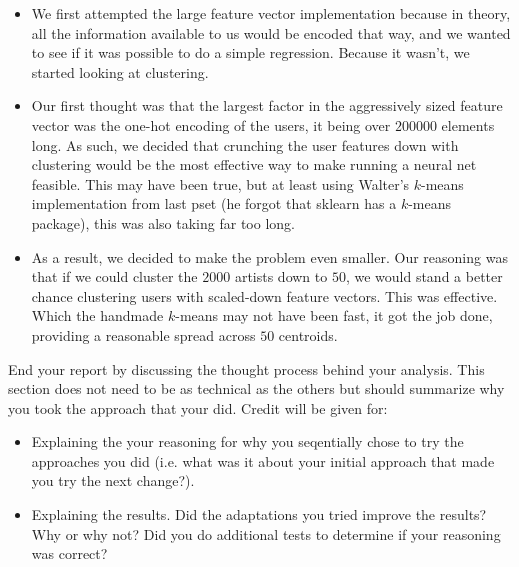 \documentclass[11pt]{article}
\begin{document}
\begin{itemize}
	\item We first attempted the large feature vector implementation because in theory, all the information available to us would be encoded that way, and we wanted to see if it was possible to do a simple regression. Because it wasn't, we started looking at clustering.
	\item Our first thought was that the largest factor in the aggressively sized feature vector was the one-hot encoding of the users, it being over $200000$ elements long. As such, we decided that crunching the user features down with clustering would be the most effective way to make running a neural net feasible. This may have been true, but at least using Walter's $k$-means implementation from last pset (he forgot that sklearn has a $k$-means package), this was also taking far too long.
	\item As a result, we decided to make the problem even smaller. Our reasoning was that if we could cluster the $2000$ artists down to $50$, we would stand a better chance clustering users with scaled-down feature vectors. This was effective. Which the handmade $k$-means may not have been fast, it got the job done, providing a reasonable spread across $50$ centroids.
\end{itemize}

End your report by discussing the thought process behind your
analysis. This section does not need to be as technical as the others 
but should summarize why you took the approach that your did. Credit will be given for:

  \begin{itemize}
  \item Explaining the your reasoning for why you seqentially chose to
    try the approaches you did (i.e. what was it about your initial
    approach that made you try the next change?).  
  \item Explaining the results.  Did the adaptations you tried improve
    the results?  Why or why not?  Did you do additional tests to
    determine if your reasoning was correct?  
  \end{itemize}
 
\end{document}
